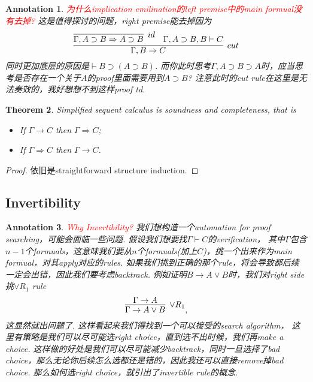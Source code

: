 \documentclass{article}
\theoremstyle{plain}
\newtheorem{theorem}{Theorem}
\newtheorem{annotation}[theorem]{Annotation}
\theoremstyle{nonumberplain}
\newtheorem{proof}{Proof}
\newcommand{\redt}[1]{\textcolor{red}{#1}}
\begin{document}
\begin{annotation}
\rm \redt{为什么implication emilination的left premise中的main formual没有去掉?} 这是值得探讨的问题，right premise能去掉因为
$$
\infer[cut]{\Gamma, B \Rightarrow C}{\infer[id]{\Gamma, A \supset B \Rightarrow A \supset B}{} & \Gamma,A \supset B, B \vdash C}
$$
同时更加底层的原因是$\vdash B \supset (A \supset B)$. 而你此时思考$\Gamma, A \supset B \supset A$时，应当思考是否存在一个关于$A$的proof里面需要用到$A \supset B$? 注意此时的\emph{cut} rule在这里是无法奏效的，我好想想不到这样proof td.
\end{annotation}

\begin{theorem}
\rm Simplified sequent calculus is soundness and completeness, that is
\begin{itemize}
	\item If $\Gamma \to C$ then $\Gamma \Rightarrow C$;
	\item If $\Gamma \Rightarrow C$ then $\Gamma \to C$.
\end{itemize}
\end{theorem}

\begin{proof}
依旧是straightforward structure induction.
\end{proof}



\newpage
\subsection{Invertibility}\label{invertible calculus}	

\begin{annotation}
 \rm \redt{Why Invertibility?} \cite{15-317-inv} 我们想构造一个automation for proof searching，可能会面临一些问题. 假设我们想要找$\Gamma \vdash C$的verification， 其中$\Gamma$包含$n-1$个formuals，这意味我们要从$n$个formuals(加上$C$)，挑一个出来作为main formual，对其apply对应的rules. 如果我们挑到正确的那个rule，将会导致都后续一定会出错，因此我们要考虑backtrack. 例如证明$B \to A \vee B$时，我们对right side挑$\vee R_1$ rule
$$
\infer[\vee R_1]{\Gamma \to A \vee B}{\Gamma \to A},
$$ 
这显然就出问题了. 这样看起来我们得找到一个可以接受的search algorithm， 这里有策略是我们可以尽可能选right choice，直到选不出时候，我们再make a choice. 这样做的好处是我们可以尽可能减少backtrack，同时一旦选择了bad choice，那么无论你后续怎么选都还是错的，因此我还可以直接remove掉bad choice. 那么如何选right choice，就引出了invertible rule的概念. 
\end{annotation}
\end{document}
